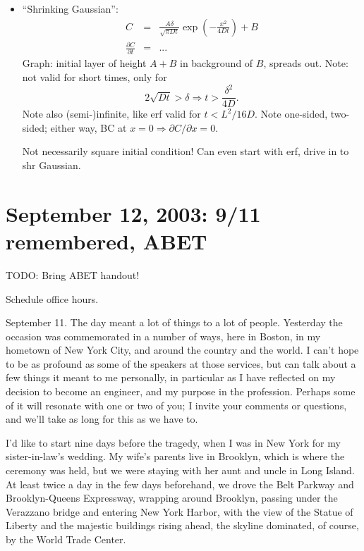 \documentclass{report}
\begin{document}
\begin{itemize}
\item ``Shrinking Gaussian'':
  \begin{eqnarray}
    \label{eq:shrgaus}
    C &=& \frac{A\delta}{\sqrt{\pi Dt}}\exp\left(-\frac{x^2}{4Dt}\right) + B \\
    \frac{\partial C}{\partial t} &=& ...
  \end{eqnarray}
  Graph: initial layer of height $A+B$ in background of $B$, spreads out.
  Note: not valid for short times, only for
  \begin{equation}
    \label{eq:gaussvalid}
    2\sqrt{Dt}>\delta \Rightarrow t > \frac{\delta^2}{4D}.
  \end{equation}
  Note also (semi-)infinite, like erf valid for $t<L^2/16D$.  Note one-sided,
  two-sided; either way, BC at $x=0\Rightarrow \partial C/\partial x=0$.

  Not necessarily square initial condition!  Can even start with erf, drive in
  to shr Gaussian.
\end{itemize}
\newpage


\section{September 12, 2003: 9/11 remembered, ABET}

TODO: Bring ABET handout!

\noindent Schedule office hours.
\vspace{\baselineskip}

September 11.  The day meant a lot of things to a lot of people.  Yesterday the
occasion was commemorated in a number of ways, here in Boston, in my hometown
of New York City, and around the country and the world.  I can't hope to be as
profound as some of the speakers at those services, but can talk about a few
things it meant to me personally, in particular as I have reflected on my
decision to become an engineer, and my purpose in the profession.  Perhaps some
of it will resonate with one or two of you; I invite your comments or
questions, and we'll take as long for this as we have to.

I'd like to start nine days before the tragedy, when I was in New York for my
sister-in-law's wedding.  My wife's parents live in Brooklyn, which is where
the ceremony was held, but we were staying with her aunt and uncle in Long
Island.  At least twice a day in the few days beforehand, we drove the Belt
Parkway and Brooklyn-Queens Expressway, wrapping around Brooklyn, passing under
the Verazzano bridge and entering New York Harbor, with the view of the Statue
of Liberty and the majestic buildings rising ahead, the skyline dominated, of
course, by the World Trade Center.
\end{document}
